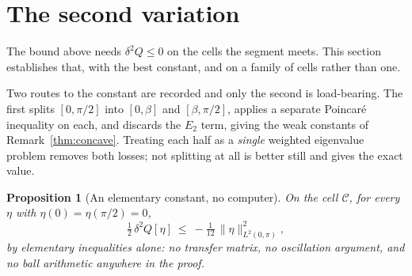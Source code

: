 \documentclass[11pt]{article}
\newtheorem{proposition}[theorem]{Proposition}
\theoremstyle{definition}
\begin{document}
\section{The second variation}\label{sec:secvar}

The bound above needs $\delta^2Q\le0$ on the cells the segment meets. This section
establishes that, with the best constant, and on a family of cells rather than one.

Two routes to the constant are recorded and only the second is load-bearing. The first
splits $[0,\pi/2]$ into $[0,\beta]$ and $[\beta,\pi/2]$, applies a separate Poincaré
inequality on each, and discards the $E_2$ term, giving the weak constants of
Remark~\ref{thm:concave}. Treating each half as a \emph{single} weighted eigenvalue
problem removes both losses; not splitting at all is better still and gives the exact
value.

\begin{proposition}[An elementary constant, no computer]\label{prop:elem}
On the cell $\mathcal C$, for every $\eta$ with $\eta(0)=\eta(\pi/2)=0$,
\[
  \tfrac12\,\delta^2Q[\eta]\ \le\ -\tfrac1{12}\,\|\eta\|^2_{L^2(0,\pi)} ,
\]
by elementary inequalities alone: no transfer matrix, no oscillation argument, and no
ball arithmetic anywhere in the proof.
\end{proposition}
\end{document}
